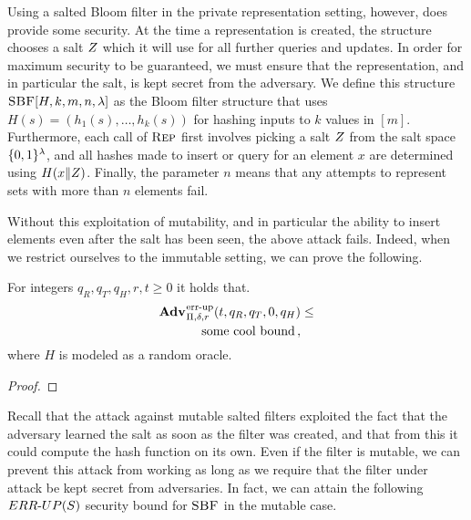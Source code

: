 {Using a salted Bloom filter in the private representation setting, however, does
provide some security. At the time a representation is created, the structure
chooses a salt $Z$ which it will use for all further queries and updates. In
order for maximum security to be guaranteed, we must ensure that the
representation, and in particular the salt, is kept secret from the adversary.
We define this structure $\textnormal{\textsc{SBF}}[H,k,m,n,\lambda]$ as the Bloom filter structure
that uses $H(s) = (h_1(s),\ldots,h_k(s))$ for hashing inputs to $k$ values in
$[m]$. Furthermore, each call of $\textnormal{\textsc{Rep}}$ first involves picking a salt $Z$
from the salt space $\{0,1\}^\lambda$, and all hashes made to insert or query for
an element $x$ are determined using $H(x \Vert Z)$. Finally, the parameter
$n$ means that any attempts to represent sets with more than $n$ elements fail.
}

Without this exploitation of mutability, and in particular the ability to insert
elements even after the salt has been seen, the above attack fails. Indeed, when
we restrict ourselves to the immutable setting, we can prove the following.
%
\begin{theorem}\label{thm:sbf-errep1}
  For integers $q_R, q_T, q_H, r, t \geq 0$ it holds that.
  \begin{equation*}
    \begin{aligned}
      \Adv{\errep}_{\Pi,\delta,r}(t, q_R,q_T,0,q_H) &\leq \\
      \hspace{20pt}
        \text{some cool bound} \,,
    \end{aligned}
  \end{equation*}
  where $H$ is modeled as a random oracle.
\end{theorem}
\begin{proof}
  
\end{proof}

Recall that the attack against mutable salted filters exploited the fact that
the adversary learned the salt as soon as the filter was created, and that from
this it could compute the hash function on its own. Even if the filter is
mutable, we can prevent this attack from working as long as we require that the
filter under attack be kept secret from adversaries. In fact, we can attain the
following ${ERR\mbox{-}UP(S)}$ security bound for $\textnormal{\textsc{SBF}}$ in the mutable case.

